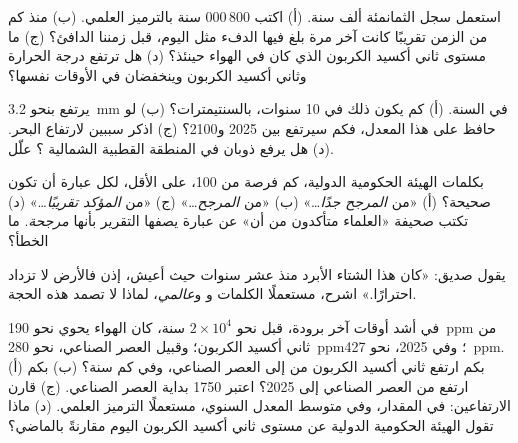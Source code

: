\begin{exercise}[$\star\star$]\label{exo:g9:climate-past-and-present:7}
استعمل سجل الثمانمئة ألف سنة. (أ) اكتب 800\,000 سنة بالترميز العلمي. (ب) منذ
كم من الزمن تقريبًا كانت آخر مرة بلغ فيها الدفء مثل اليوم، قبل زمننا الدافئ؟
(ج) ما مستوى ثاني أكسيد الكربون الذي كان في الهواء حينئذ؟ (د) هل ترتفع درجة
الحرارة وثاني أكسيد الكربون وينخفضان في الأوقات
نفسها؟
\end{exercise}

\begin{exercise}[$\star\star$]\label{exo:g9:climate-past-and-present:8}
يرتفع  بنحو \qty{3.2}{mm} في السنة. (أ) كم يكون ذلك في 10 سنوات،
بالسنتيمترات؟ (ب) لو حافظ على هذا المعدل، فكم سيرتفع بين 2025 و2100؟ (ج) اذكر
سببين لارتفاع البحر. (د) هل يرفع ذوبان  في المنطقة القطبية
الشمالية ؟ علّل.
\end{exercise}

\begin{exercise}[$\star\star$]\label{exo:g9:climate-past-and-present:9}
بكلمات الهيئة الحكومية الدولية، كم فرصة من 100، على الأقل، لكل عبارة أن تكون
صحيحة؟ (أ) «من \emph{المرجح جدًا}\ldots» (ب) «من \emph{المرجح}\ldots» (ج) «من
\emph{المؤكد تقريبًا}\ldots» (د) تكتب صحيفة «العلماء متأكدون من أن» عن عبارة
يصفها التقرير بأنها \emph{مرجحة}. ما الخطأ؟
\end{exercise}

\begin{exercise}[$\star\star$]\label{exo:g9:climate-past-and-present:10}
يقول صديق: «كان هذا الشتاء الأبرد منذ عشر سنوات حيث أعيش، إذن فالأرض لا تزداد
احترارًا.» اشرح، مستعملًا الكلمات \emph{} و\emph{} و\emph{عالمي}، لماذا
لا تصمد هذه الحجة.
\end{exercise}

\begin{exercise}[$\star\star\star$]\label{exo:g9:climate-past-and-present:11}
في أشد أوقات آخر  برودة، قبل نحو $2 \times 10^4$ سنة، كان الهواء يحوي
نحو \qty{190}{ppm} من ثاني أكسيد الكربون؛ وقبيل العصر الصناعي، نحو
\qty{280}{ppm}؛ وفي 2025، نحو \qty{427}{ppm}. (أ) بكم ارتفع ثاني أكسيد الكربون
من  إلى العصر الصناعي، وفي كم سنة؟ (ب) بكم ارتفع من العصر الصناعي
إلى 2025؟ اعتبر 1750 بداية العصر الصناعي. (ج) قارن الارتفاعين: في المقدار، وفي
متوسط المعدل السنوي، مستعملًا الترميز العلمي. (د) ماذا تقول الهيئة الحكومية
الدولية عن مستوى ثاني أكسيد الكربون اليوم مقارنةً بالماضي؟
\end{exercise}

